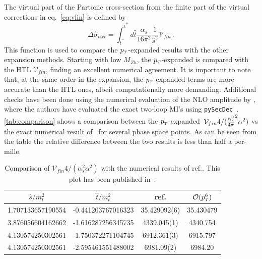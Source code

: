 The virtual part of the Partonic cross-section
from the finite part of the virtual corrections in eq.~\eqref{eq:vfin} is defined  by
\begin{equation}
	\Delta \hat{\sigma}_{virt}=
	\int_{\hat{t}^-}^{\hat{t}^+} d\hat{t}
	\frac{\alpha_s}{16\pi^2}\frac{1}{\hat{s}^2}\mathcal{V}_{fin}\, .
	\label{eq:deltasigma}
\end{equation}
This function is used to compare the $p_{\scriptscriptstyle T}$-expanded results with the other expansion methods. Starting with low $M_{Zh}$, 
the $p_{\scriptscriptstyle T}$-expanded is compared with the HTL 	$\mathcal{V}_{fin}$, finding an excellent numerical agreement.
It is important to note that, at the same order in the expansion, 
the $p_{\scriptscriptstyle T}$-expanded terms are more accurate than
the HTL ones, albeit computationally more demanding.  Additional checks have been done using the numerical evaluation of the NLO amplitude by \cite{Chen:2020gae}, where the authors have evaluated the exact two-loop MI's using \texttt{pySecDec}~\cite{Borowka:2017idc, Borowka:2018goh}.  \autoref{tab:comparison} shows a comparison between the $p_{\scriptscriptstyle T}$-expanded~$\mathcal{V}_{fin} 4/(\frac{\alpha_s^0}{4 \pi}^2 \alpha^2)$ vs the exact numerical result of~\cite{Chen:2020gae} for several phase space points. 
As can be seen from the table the relative difference 
between the two results is less than half a per-mille.
\begin{table}
	\renewcommand{\arraystretch}{1.2}
	\centering
	\begin{tabular}{| c| c | c | c| } \hline
		\rowcolor{lightgray}  $\hat{s}/m_t^2$ & $\hat{t}/m_t^2$ &  ref.\cite{Chen:2020gae} & $\mathcal{O}(p_{\scriptscriptstyle T}^6)$  \\ \hline 
		\cellcolor{lightgray} 1.707133657190554 & \cellcolor{lightgray} -0.441203767016323 & 35.429092(6) & 35.430479 \\
		\cellcolor{lightgray} 3.876056604162662 & \cellcolor{lightgray} -1.616287256345735 & 4339.045(1) & 4340.754 \\
		\cellcolor{lightgray} 4.130574250302561 & \cellcolor{lightgray} -1.750372271104745 & 6912.361(3) & 6915.797 \\
		\cellcolor{lightgray} 4.130574250302561 & \cellcolor{lightgray} -2.595461551488002 & 6981.09(2) & 6984.20  \\ \hline
	\end{tabular}
	\caption{Comparison of $\mathcal{V}_{fin} 4/(\alpha_s^2 \alpha^2)$ with the numerical results of ref.\cite{Chen:2020gae}. This plot has been published in~\cite{Alasfar:2021ppe}. \label{tab:comparison}}
\end{table}
